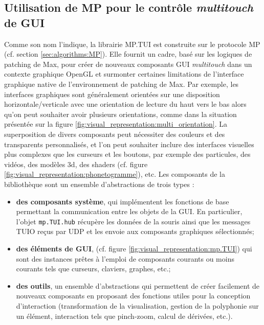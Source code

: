 \subsection{Utilisation de MP pour le contrôle \textit{multitouch} de GUI}

\noindent Comme son nom l'indique, la librairie MP.TUI est construite sur le protocole MP (cf. section \ref{sec:algorithms:MP}). Elle fournit un cadre, basé sur les logiques de patching de Max, pour créer de nouveaux composants \gls{GUI} \textit{multitouch} dans un contexte graphique OpenGL et surmonter certaines limitations de l'interface graphique native de l'environnement de patching de Max. Par exemple, les interfaces graphiques sont généralement orientées sur une disposition horizontale/verticale avec une orientation de lecture du haut vers le bas alors qu'on peut souhaiter avoir plusieurs orientations, comme dans la situation présentée sur la figure \ref{fig:visual_representation:multi_orientation}. La superposition de divers composants peut nécessiter des couleurs et des transparents personnalisés, et l'on peut souhaiter inclure des interfaces visuelles plus complexes que les curseurs et les boutons, par exemple des particules, des vidéos, des modèles 3d, des shaders (cf. figure \ref{fig:visual_representation:phonetogramme}), etc. Les composants de la bibliothèque sont un ensemble d'abstractions de trois types :
\vspace{-1em}
\begin{itemize}[noitemsep]
	\item \textbf{des composants système}, qui implémentent les fonctions de base permettant la communication entre les objets de la \gls{GUI}. En particulier, l'objet \verb|mp.TUI.hub| récupère les données de la souris ainsi que les messages \gls{TUIO} reçus par \gls{UDP} et les envoie aux composants graphiques sélectionnés;
	\item \textbf{des éléments de GUI}, (cf. figure \ref{fig:visual_representation:mp.TUI}) qui sont des instances prêtes à l'emploi de composants courants ou moins courants tels que curseurs, claviers, graphes, etc.;
	\item \textbf{des outils}, un ensemble d'abstractions qui permettent de créer facilement de nouveaux composants en proposant des fonctions utiles pour la conception d'interaction (transformation de la visualisation, gestion de la polyphonie sur un élément, interaction tels que pinch-zoom, calcul de dérivées, etc.).
\end{itemize}

